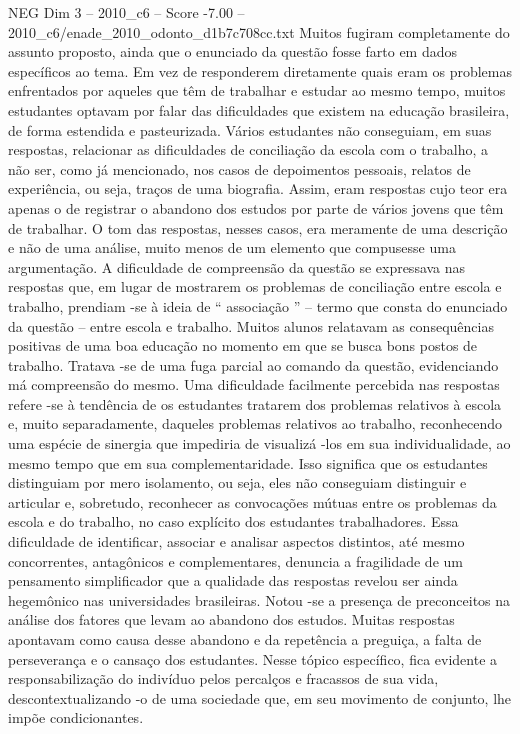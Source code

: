 \begin{textsample}{NEG Dim 3 – 2010\_c6 – Score -7.00 – 2010\_c6/enade\_2010\_odonto\_d1b7c708cc.txt}
Muitos fugiram completamente do assunto proposto, ainda que o enunciado da questão fosse farto em dados específicos ao tema.
Em vez de responderem diretamente quais eram os problemas enfrentados por aqueles que têm de trabalhar e estudar ao mesmo tempo, muitos estudantes optavam por falar das dificuldades que existem na educação brasileira, de forma estendida e pasteurizada.
Vários estudantes não conseguiam, em suas respostas, relacionar as dificuldades de conciliação da escola com o trabalho, a não ser, como já mencionado, nos casos de depoimentos pessoais, relatos de experiência, ou seja, traços de uma biografia.
Assim, eram respostas cujo teor era apenas o de registrar o abandono dos estudos por parte de vários jovens que têm de trabalhar.
O tom das respostas, nesses casos, era meramente de uma descrição e não de uma análise, muito menos de um elemento que compusesse uma argumentação.
A dificuldade de compreensão da questão se expressava nas respostas que, em lugar de mostrarem os problemas de conciliação entre escola e trabalho, prendiam -se à ideia de “ associação ” – termo que consta do enunciado da questão – entre escola e trabalho.
Muitos alunos relatavam as consequências positivas de uma boa educação no momento em que se busca bons postos de trabalho.
Tratava -se de uma fuga parcial ao comando da questão, evidenciando má compreensão do mesmo.
Uma dificuldade facilmente percebida nas respostas refere -se à tendência de os estudantes tratarem dos problemas relativos à escola e, muito separadamente, daqueles problemas relativos ao trabalho, reconhecendo uma espécie de sinergia que impediria de visualizá -los em sua individualidade, ao mesmo tempo que em sua complementaridade.
Isso significa que os estudantes distinguiam por mero isolamento, ou seja, eles não conseguiam distinguir e articular e, sobretudo, reconhecer as convocações mútuas entre os problemas da escola e do trabalho, no caso explícito dos estudantes trabalhadores.
Essa dificuldade de identificar, associar e analisar aspectos distintos, até mesmo concorrentes, antagônicos e complementares, denuncia a fragilidade de um pensamento simplificador que a qualidade das respostas revelou ser ainda hegemônico nas universidades brasileiras.
Notou -se a presença de preconceitos na análise dos fatores que levam ao abandono dos estudos.
Muitas respostas apontavam como causa desse abandono e da repetência a preguiça, a falta de perseverança e o cansaço dos estudantes.
Nesse tópico específico, fica evidente a responsabilização do indivíduo pelos percalços e fracassos de sua vida, descontextualizando -o de uma sociedade que, em seu movimento de conjunto, lhe impõe condicionantes.

\end{textsample}
